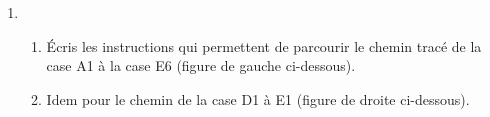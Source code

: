 \documentclass[class=report,crop=false, 12pt]{standalone}
\begin{document}
\begin{activite}
\begin{enumerate}
\begin{enumerate}
    
  \end{enumerate} 
 
  
  \item
  \begin{enumerate}
    \item Écris les instructions qui permettent de parcourir le chemin tracé de la case A1 à la case E6 (figure de gauche ci-dessous).
     
    \item Idem pour le chemin de la case D1 à E1 (figure de droite ci-dessous).   

  \end{enumerate}   
\end{enumerate}

\end{activite}
\end{document}
